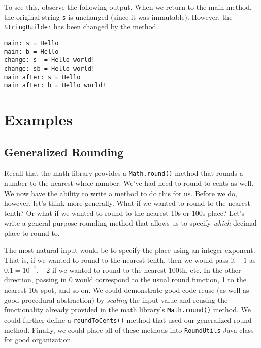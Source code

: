 To see this, observe the following output.  When we
return to the main method, the original string \texttt{s}
is unchanged (since it was immutable).  However, the
\texttt{StringBuilder} has been changed by
the method.


\begin{verbatim}
main: s = Hello
main: b = Hello
change: s  = Hello world!
change: sb = Hello world!
main after: s = Hello
main after: b = Hello world!
\end{verbatim}

\section{Examples}

\subsection{Generalized Rounding}

Recall that the math library provides a 
\texttt{Math.round()} method that rounds a number to 
the nearest whole number.  We've had need to round to 
cents as well.  We now have the ability to write a method to do 
this for us.  Before we do, however, let's think more generally.  
What if we wanted to round to the nearest tenth?  Or
what if we wanted to round to the nearest 10s or 100s place?  Let's
write a general purpose rounding method that allows us to specify
\emph{which} decimal place to round to.  

The most natural input would be to specify the place using
an integer exponent.  That is, if we wanted to round to the nearest
tenth, then we would pass it $-1$ as $0.1 = 10^{-1}$, $-2$ if we wanted
to round to the nearest 100th, etc.  In the other direction, passing in 0
would correspond to the usual round function, 1 to the nearest 10s spot, 
and so on. We could demonstrate good code reuse (as well as good procedural
abstraction) by \emph{scaling} the input value and reusing the functionality
already provided in the math library's \texttt{Math.round()} 
method.  We could further define a \texttt{roundToCents()} 
method that used our generalized round method.  Finally, we could place
all of these methods into \texttt{RoundUtils} Java class for
good organization.

